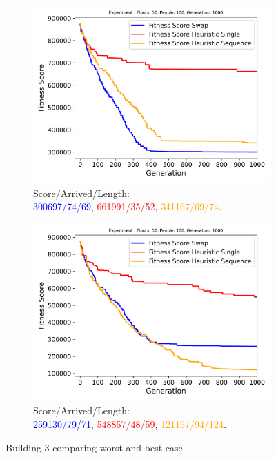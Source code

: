 \begin{figure}[ht]
	\centering
	\begin{subfigure}[b]{0.49\linewidth}
		\centering
		\includegraphics[width=\linewidth]{results/Building3/Mutation_0.1/Floors: 50, People: 100, Generation: 1000_4_worst.png}
		\captionsetup{justification=centering,font=tiny}
		\caption{Score/Arrived/Length:\\\textcolor{blue}{300697/74/69}, \textcolor{red}{661991/35/52}, \textcolor{orange}{341167/69/74}.}
		\label{fig:Building3 worst}
	\end{subfigure}
	\hfill
	\begin{subfigure}[b]{0.49\linewidth}
		\centering
		\includegraphics[width=\linewidth]{results/Building3/Mutation_0.1/Floors: 50, People: 100, Generation: 1000_1_best.png}
		\captionsetup{justification=centering,font=tiny}
		\caption{Score/Arrived/Length:\\\textcolor{blue}{259130/79/71}, \textcolor{red}{548857/48/59}, \textcolor{orange}{121157/94/124}.}
		\label{fig:Building3 best}
	\end{subfigure}
	\captionsetup{font=scriptsize}
	\caption{Building 3 comparing worst and best case.}
	\label{fig:Building3 results}
\end{figure}
\newpage
